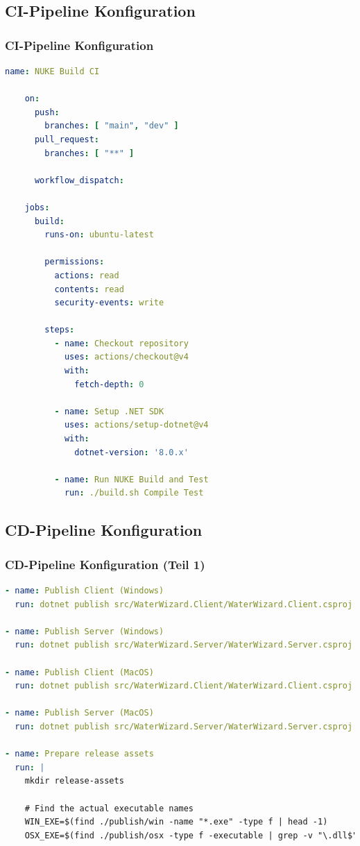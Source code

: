 \documentclass{beamer}
\begin{document}
\subsection{CI-Pipeline Konfiguration}
\begin{frame}[fragile]
\frametitle{CI-Pipeline Konfiguration}
  \begin{lstlisting}[language=yaml, basicstyle=\ttfamily\tiny, breaklines=true]
    name: NUKE Build CI

    on:
      push:
        branches: [ "main", "dev" ] 
      pull_request:
        branches: [ "**" ] 

      workflow_dispatch:

    jobs:
      build:
        runs-on: ubuntu-latest 

        permissions:
          actions: read 
          contents: read 
          security-events: write 

        steps:
          - name: Checkout repository
            uses: actions/checkout@v4
            with:
              fetch-depth: 0 

          - name: Setup .NET SDK
            uses: actions/setup-dotnet@v4
            with:
              dotnet-version: '8.0.x'

          - name: Run NUKE Build and Test
            run: ./build.sh Compile Test
  \end{lstlisting}
\end{frame}

\subsection{CD-Pipeline Konfiguration}
\begin{frame}[fragile]
\frametitle{CD-Pipeline Konfiguration (Teil 1)}
  \begin{lstlisting}[language=yaml, basicstyle=\ttfamily\tiny, breaklines=true]
- name: Publish Client (Windows)
  run: dotnet publish src/WaterWizard.Client/WaterWizard.Client.csproj -c Release -r win-x64 --self-contained true -o ./publish/win --verbosity normal

- name: Publish Server (Windows)
  run: dotnet publish src/WaterWizard.Server/WaterWizard.Server.csproj -c Release -r win-x64 --self-contained true -o ./publish/win-server

- name: Publish Client (MacOS)
  run: dotnet publish src/WaterWizard.Client/WaterWizard.Client.csproj -c Release -r osx-x64 --self-contained true -o ./publish/osx --verbosity normal

- name: Publish Server (MacOS)
  run: dotnet publish src/WaterWizard.Server/WaterWizard.Server.csproj -c Release -r osx-x64 --self-contained true -o ./publish/osx-server

- name: Prepare release assets
  run: |
    mkdir release-assets

    # Find the actual executable names
    WIN_EXE=$(find ./publish/win -name "*.exe" -type f | head -1)
    OSX_EXE=$(find ./publish/osx -type f -executable | grep -v "\.dll$" | grep -v "\.so$" | head -1)
  \end{lstlisting}
\end{frame}
\end{document}
